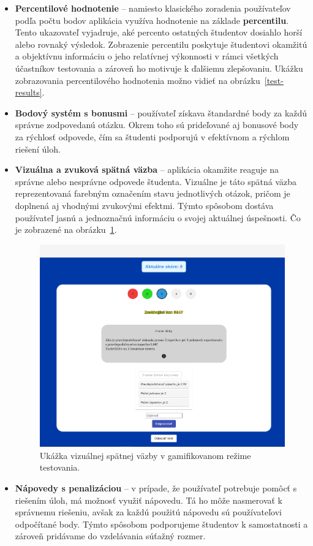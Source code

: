 \begin{itemize} \item \textbf{Percentilové hodnotenie} – namiesto klasického zoradenia používateľov podľa počtu bodov aplikácia využíva hodnotenie na základe \textbf{percentilu}. 
  Tento ukazovateľ vyjadruje, aké percento ostatných študentov dosiahlo horší alebo rovnaký výsledok.
   Zobrazenie percentilu poskytuje študentovi okamžitú a objektívnu informáciu o jeho relatívnej výkonnosti v rámci všetkých účastníkov testovania a zároveň ho motivuje k ďalšiemu zlepšovaniu.
  Ukážku zobrazovania percentilového hodnotenia možno vidieť na obrázku~\ref{test-results}.
  

\item \textbf{Bodový systém s bonusmi} – používateľ získava štandardné body za každú správne zodpovedanú otázku. 
Okrem toho sú prideľované aj bonusové body za rýchlosť odpovede, čím sa študenti podporujú v efektívnom a rýchlom riešení úloh.

\item \textbf{Vizuálna a zvuková spätná väzba} – aplikácia okamžite reaguje na správne alebo nesprávne odpovede študenta.
 Vizuálne je táto spätná väzba reprezentovaná farebným označením stavu jednotlivých otázok, pričom je doplnená aj vhodnými zvukovými efektmi. 
Týmto spôsobom dostáva používateľ jasnú a jednoznačnú informáciu o svojej aktuálnej úspešnosti. Čo je zobrazené na obrázku~\ref{gamification}.

\begin{figure}[H]
  \centering
  \includegraphics[width=14cm]{img/gamification.png}
  \caption{Ukážka vizuálnej spätnej väzby v gamifikovanom režime testovania.}
  \label{gamification}
\end{figure}

\item \textbf{Nápovedy s penalizáciou} – v prípade, že používateľ potrebuje pomôcť s riešením úloh, má možnosť využiť nápovedu. Tá ho môže nasmerovať k správnemu riešeniu, avšak za každú použitú nápovedu sú používateľovi odpočítané body. Týmto spôsobom podporujeme študentov k samostatnosti a zároveň pridávame do vzdelávania súťažný rozmer. \end{itemize}

